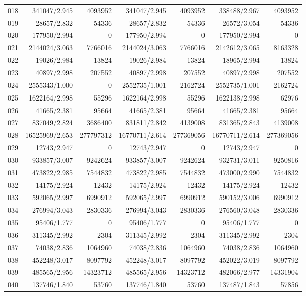 \begin{longtable}{crrrrrr}
018 & 341047/2.945 & 4093952 & 341047/2.945 & 4093952 & 338488/2.967 & 4093952 \\
019 & 28657/2.832 & 54336 & 28657/2.832 & 54336 & 26572/3.054 & 54336 \\
020 & 177950/2.994 & 0 & 177950/2.994 & 0 & 177950/2.994 & 0 \\
021 & 2144024/3.063 & 7766016 & 2144024/3.063 & 7766016 & 2142612/3.065 & 8163328 \\
022 & 19026/2.984 & 13824 & 19026/2.984 & 13824 & 18965/2.994 & 13824 \\
023 & 40897/2.998 & 207552 & 40897/2.998 & 207552 & 40897/2.998 & 207552 \\
024 & 2555343/1.000 & 0 & 2552735/1.001 & 2162724 & 2552735/1.001 & 2162724 \\
025 & 1622164/2.998 & 55296 & 1622164/2.998 & 55296 & 1622138/2.998 & 62976 \\
026 & 41665/2.381 & 95664 & 41665/2.381 & 95664 & 41665/2.381 & 95664 \\
027 & 837049/2.824 & 3686400 & 831811/2.842 & 4139008 & 831365/2.843 & 4139008 \\
028 & 16525969/2.653 & 277797312 & 16770711/2.614 & 277369056 & 16770711/2.614 & 277369056 \\
029 & 12743/2.947 & 0 & 12743/2.947 & 0 & 12743/2.947 & 0 \\
030 & 933857/3.007 & 9242624 & 933857/3.007 & 9242624 & 932731/3.011 & 9250816 \\
031 & 473822/2.985 & 7544832 & 473822/2.985 & 7544832 & 473000/2.990 & 7544832 \\
032 & 14175/2.924 & 12432 & 14175/2.924 & 12432 & 14175/2.924 & 12432 \\
033 & 592065/2.997 & 6990912 & 592065/2.997 & 6990912 & 590152/3.006 & 6990912 \\
034 & 276994/3.043 & 2830336 & 276994/3.043 & 2830336 & 276560/3.048 & 2830336 \\
035 & 95406/1.777 & 0 & 95406/1.777 & 0 & 95406/1.777 & 0 \\
036 & 311345/2.992 & 2304 & 311345/2.992 & 2304 & 311345/2.992 & 2304 \\
037 & 74038/2.836 & 1064960 & 74038/2.836 & 1064960 & 74038/2.836 & 1064960 \\
038 & 452248/3.017 & 8097792 & 452248/3.017 & 8097792 & 452022/3.019 & 8097792 \\
039 & 485565/2.956 & 14323712 & 485565/2.956 & 14323712 & 482066/2.977 & 14331904 \\
040 & 137746/1.840 & 53760 & 137746/1.840 & 53760 & 137487/1.843 & 57856 \\

\end{longtable}
